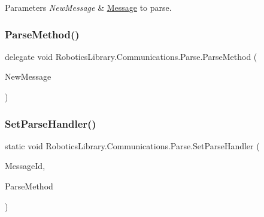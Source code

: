 \begin{DoxyParams}{Parameters}
{\em New\+Message} & \hyperlink{class_robotics_library_1_1_communications_1_1_message}{Message} to parse.\\
\hline
\end{DoxyParams}
\mbox{\label{class_robotics_library_1_1_communications_1_1_parse_a592095b5638ced6eacabbce7acdb5e75}} 
\subsubsection{\texorpdfstring{Parse\+Method()}{ParseMethod()}}
{\footnotesize\ttfamily delegate void Robotics\+Library.\+Communications.\+Parse.\+Parse\+Method (\begin{DoxyParamCaption}\item[{\hyperlink{class_robotics_library_1_1_communications_1_1_message}{Message}}]{New\+Message }\end{DoxyParamCaption})}

\mbox{\label{class_robotics_library_1_1_communications_1_1_parse_a2edbe1773ccbf303fb505ce0ad2ee838}} 
\subsubsection{\texorpdfstring{Set\+Parse\+Handler()}{SetParseHandler()}}
{\footnotesize\ttfamily static void Robotics\+Library.\+Communications.\+Parse.\+Set\+Parse\+Handler (\begin{DoxyParamCaption}\item[{byte}]{Message\+Id,  }\item[{\hyperlink{class_robotics_library_1_1_communications_1_1_parse_a592095b5638ced6eacabbce7acdb5e75}{Parse\+Method}}]{Parse\+Method }\end{DoxyParamCaption})\hspace{0.3cm}{\ttfamily [static]}}



